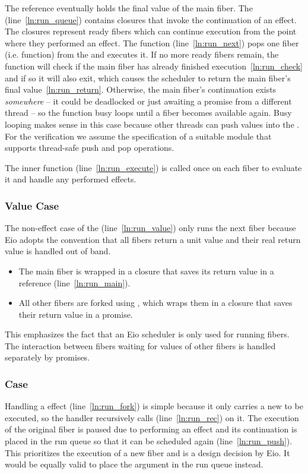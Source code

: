 The  reference eventually holds the final value of the main fiber.
The  (line~\ref{ln:run_queue}) contains closures that invoke the continuation of an effect.
The closures represent ready fibers which can continue execution from the point where they performed an effect.
The  function (line~\ref{ln:run_next}) pops one fiber (i.e. function) from the  and executes it.
If no more ready fibers remain, the function will check if the main fiber has already finished execution~\ref{ln:run_check} and if so it will also exit, which causes the scheduler to return the main fiber's final value~\ref{ln:run_return}.
Otherwise, the main fiber's continuation exists \emph{somewhere} -- it could be deadlocked or just awaiting a promise from a different thread -- so the  function busy loops until a fiber becomes available again.
Busy looping makes sense in this case because other threads can push values into the .
For the verification we assume the specification of a suitable  module that supports thread-safe push and pop operations.

The inner  function (line~\ref{ln:run_execute}) is called once on each fiber to evaluate it and handle any performed effects.
\subsubsection*{Value Case}
The non-effect case of the  (line~\ref{ln:run_value}) only runs the next fiber because Eio adopts the convention that all fibers return a unit value and their real return value is handled out of band.
\begin{itemize}
  \item The main fiber is wrapped in a closure that saves its return value in a reference (line~\ref{ln:run_main}).
  \item All other fibers are forked using , which wraps them in a closure that saves their return value in a promise.
\end{itemize}

This emphasizes the fact that an Eio scheduler is only used for running fibers.
The interaction between fibers waiting for values of other fibers is handled separately by promises.

\subsubsection*{\efork{} Case}
Handling a \efork{} effect (line~\ref{ln:run_fork}) is simple because it only carries a new  to be executed, so the handler recursively calls  (line~\ref{ln:run_rec}) on it.
The execution of the original fiber is paused due to performing an effect and its continuation  is placed in the run queue so that it can be scheduled again (line~\ref{ln:run_push}).
This prioritizes the execution of a new fiber and is a design decision by Eio.
It would be equally valid to place the  argument in the run queue instead.

